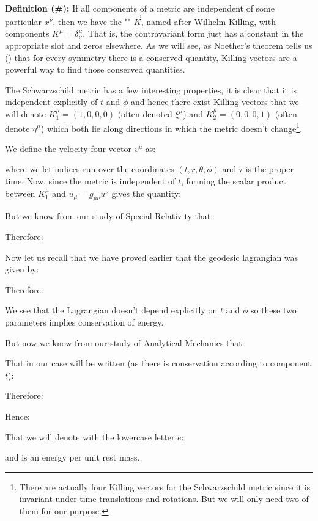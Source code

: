 	\textbf{Definition (\#\mydef):} If all components of a metric are independent of some particular $x^\nu$, then we have the "" $\vec{K}$, named after Wilhelm Killing, with components $K^\mu=\delta_\nu^\mu$. That is, the contravariant form just has a constant in the appropriate slot and zeros elsewhere. As we will see, as Noether's theorem tells us () that for every symmetry there is a conserved quantity, Killing vectors are a powerful way to find those conserved quantities.
	
	The Schwarzschild metric has a few interesting properties, it is clear that it is independent explicitly of $t$ and $\phi$ and hence there exist Killing vectors that we will denote $K_1^\mu=(1,0,0,0)$ (often denoted $\xi^\mu$) and $K_2^\mu=(0,0,0,1)$ (often denote $\eta^\mu$) which both lie along directions in which the metric doesn't change\footnote{There are actually four Killing vectors for the Schwarzschild metric since it is invariant under time translations and rotations. But we will only need two of them for our purpose.}.
	
	We define the velocity four-vector $v^\mu$ as:
	
	where we let indices run over the coordinates $(t,r,\theta,\phi)$ and $\tau$ is the proper time. Now, since the metric is independent of $t$, forming the scalar product between $K_1^\mu$ and $u_\mu=g_{\mu\nu}u^\nu$ gives the quantity:
	
	But we know from our study of Special Relativity that:
	
	Therefore:
	
	Now let us recall that we have proved earlier that the geodesic lagrangian was given by:
	
	Therefore:
	
	We see that the Lagrangian doesn't depend explicitly on $t$ and $\phi$ so these two parameters implies conservation of energy.
	
	But now we know from our study of Analytical Mechanics that:
	 
	That in our case will be written (as there is conservation according to component $t$):
	
	Therefore:
	
	Hence:
	
	That we will denote with the lowercase letter $e$:
	
	and is an energy per unit rest mass.
	
